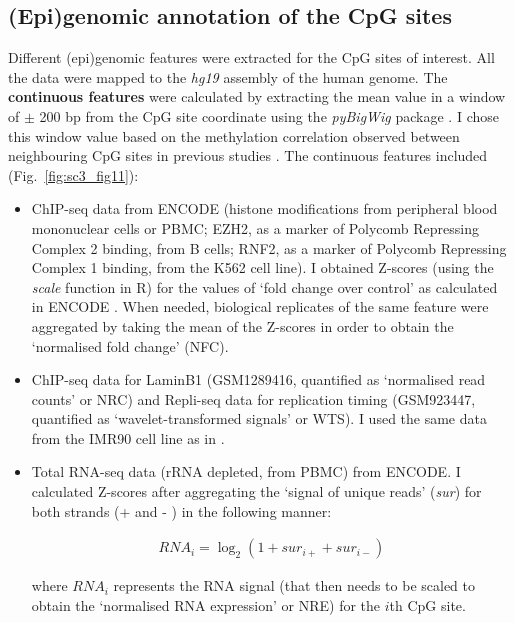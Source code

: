\subsection*{(Epi)genomic annotation of the CpG sites}

Different (epi)genomic features were extracted for the CpG sites of interest. All the data were mapped to the \textit{hg19} assembly of the human genome.
The \textbf{continuous features} were calculated by extracting the mean value in a window of $\pm$ 200 bp from the CpG site coordinate using the \textit{pyBigWig} package \citep{Richter}. I chose this window value based on the methylation correlation observed between neighbouring CpG sites in previous studies \citep{Zhang2015}. The continuous features included (Fig.~\ref{fig:sc3_fig11}):

\begin{itemize}
	
	\item ChIP-seq data from ENCODE (histone modifications from peripheral blood mononuclear cells or \acrshort{PBMC}; EZH2, as a marker of Polycomb Repressing Complex 2 binding, from B cells; RNF2, as a marker of Polycomb Repressing Complex 1 binding, from the K562 cell line). I obtained Z-scores (using the \textit{scale} function in R) for the values of `fold change over control' as calculated in ENCODE \citep{Consortium2012}. When needed, biological replicates of the same feature were aggregated by taking the mean of the Z-scores in order to obtain the `normalised fold change' (\acrshort{NFC}).
	
	\item ChIP-seq data for LaminB1 (GSM1289416, quantified as `normalised read counts' or \acrshort{NRC}) and \acrshort{Repli-seq} data for replication timing (GSM923447, quantified as `wavelet-transformed signals' or \acrshort{WTS}). I used the same data from the IMR90 cell line as in \citep{Zhou2018}.
	
	\item Total RNA-seq data (\acrshort{rRNA} depleted, from PBMC) from ENCODE. I calculated Z-scores after aggregating the `signal of unique reads' (\textit{\acrshort{sur}}) for both strands (+ and - ) in the following manner:
	
	\begin{align}
	RNA_i = \log_2(1 + sur_{i+} + sur_{i-})
	\end{align}
	
	where $RNA_i$ represents the RNA signal (that then needs to be scaled to obtain the `normalised RNA expression' or \acrshort{NRE}) for the $i$th CpG site.
	
\end{itemize}

